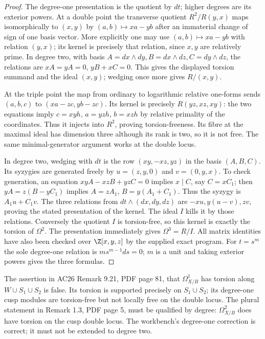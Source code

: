 \begin{proof}
The degree-one presentation is the quotient by $dt$; higher degrees
are its exterior powers.  At a double point the transverse quotient
$R^2/R(y,x)$ maps isomorphically to $(x,y)$ by
$(a,b)\mapsto xa-yb$ after an immaterial change of sign of one
basis vector.  More explicitly one may use
$(a,b)\mapsto xa-yb$ with relation $(y,x)$; its kernel is precisely
that relation, since $x,y$ are relatively prime.  In degree two,
with basis $A=dx\wedge dy,B=dx\wedge dz,C=dy\wedge dz$, the
relations are $xA=yA=0$, $yB+xC=0$.  This gives the displayed
torsion summand and the ideal $(x,y)$; wedging once more gives
$R/(x,y)$.

At the triple point the map from ordinary to logarithmic relative
one-forms sends $(a,b,c)$ to $(xa-zc,yb-zc)$.
Its kernel is precisely $R(yz,xz,xy)$: the two equations imply
$c=xyh$, $a=yzh$, $b=xzh$ by relative primality of the coordinates.
Thus it injects into $R^2$, proving torsion-freeness.  Its fibre at
the maximal ideal has dimension three although its rank is two,
so it is not free.  The same minimal-generator argument works at
the double locus.

In degree two, wedging with $dt$ is the row
$(xy,-xz,yz)$ in the basis $(A,B,C)$.
Its syzygies are generated freely by
$u=(z,y,0)$ and $v=(0,y,x)$.
To check generation, an equation $xyA-xzB+yzC=0$ implies
$x\mid C$, say $C=xC_1$; then $yA=z(B-yC_1)$ implies
$A=zA_1$, $B=y(A_1+C_1)$.  Thus the syzygy is $A_1u+C_1v$.
The three relations from $dt\wedge(dx,dy,dz)$ are
$-xu,y(u-v),zv$, proving the stated presentation of the kernel.
The ideal $I$ kills it by those relations.  Conversely the quotient
$I$ is torsion-free, so this kernel is exactly the torsion of
$\Omega^2$.  The presentation immediately gives $\Omega^3=R/I$.
All matrix identities have also been checked over $\Z[x,y,z]$ by
the supplied exact program.  For $t=s^m$ the sole degree-one
relation is $ms^{m-1}ds=0$; $m$ is a unit and taking exterior
powers gives the three formulas.
\end{proof}

\begin{proposition}\label{inv:A4.2}
The assertion in AC26 Remark 9.21, PDF page 81, that
$\Omega_{X/B}^1$ has torsion along $W\cup S_1\cup S_2$ is false.
Its torsion is supported precisely on $S_1\cup S_2$; its degree-one
cusp modules are torsion-free but not locally free on the double
locus.  The plural statement in Remark 1.3, PDF page 5, must be
qualified by degree: $\Omega^2_{X/B}$ does have torsion on the cusp
double locus.  The workbench's degree-one correction is correct;
it must not be extended to degree two.
\end{proposition}

